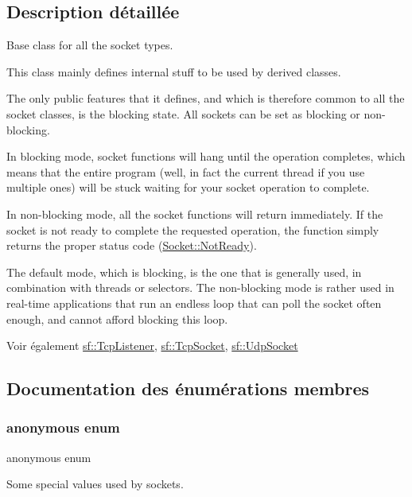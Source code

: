 \subsection{Description détaillée}
Base class for all the socket types. 

This class mainly defines internal stuff to be used by derived classes.

The only public features that it defines, and which is therefore common to all the socket classes, is the blocking state. All sockets can be set as blocking or non-\/blocking.

In blocking mode, socket functions will hang until the operation completes, which means that the entire program (well, in fact the current thread if you use multiple ones) will be stuck waiting for your socket operation to complete.

In non-\/blocking mode, all the socket functions will return immediately. If the socket is not ready to complete the requested operation, the function simply returns the proper status code (\hyperlink{classsf_1_1Socket_a51bf0fd51057b98a10fbb866246176dca8554848daae98f996e131bdeed076c09}{Socket\+::\+Not\+Ready}).

The default mode, which is blocking, is the one that is generally used, in combination with threads or selectors. The non-\/blocking mode is rather used in real-\/time applications that run an endless loop that can poll the socket often enough, and cannot afford blocking this loop.

\begin{DoxySeeAlso}{Voir également}
\hyperlink{classsf_1_1TcpListener}{sf\+::\+Tcp\+Listener}, \hyperlink{classsf_1_1TcpSocket}{sf\+::\+Tcp\+Socket}, \hyperlink{classsf_1_1UdpSocket}{sf\+::\+Udp\+Socket} 
\end{DoxySeeAlso}


\subsection{Documentation des énumérations membres}
\mbox{\label{classsf_1_1Socket_a5deb2c955fd347259c3a20d27b2481aa}} 
\subsubsection{\texorpdfstring{anonymous enum}{anonymous enum}}
{\footnotesize\ttfamily anonymous enum}



Some special values used by sockets. 

